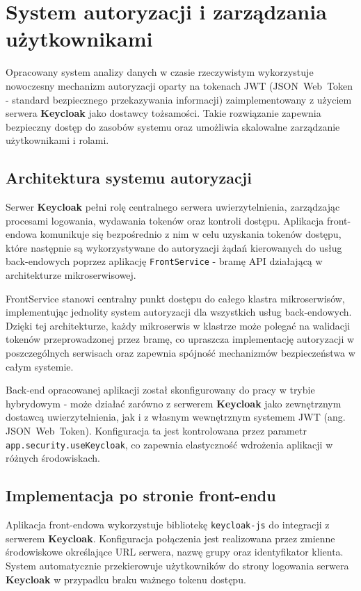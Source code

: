 \section{System autoryzacji i zarządzania użytkownikami}
\label{chap:autoryzacja}

Opracowany system analizy danych w czasie rzeczywistym wykorzystuje nowoczesny mechanizm autoryzacji oparty na tokenach \mbox{JWT} (\mbox{JSON Web Token} - standard bezpiecznego przekazywania informacji) zaimplementowany z użyciem serwera \textbf{Keycloak} jako dostawcy tożsamości. Takie rozwiązanie zapewnia bezpieczny dostęp do zasobów systemu oraz umożliwia skalowalne zarządzanie użytkownikami i rolami.

\subsection{Architektura systemu autoryzacji}

Serwer \textbf{Keycloak} pełni rolę centralnego serwera uwierzytelnienia, zarządzając procesami logowania, wydawania tokenów oraz kontroli dostępu. Aplikacja front-endowa komunikuje się bezpośrednio z nim w celu uzyskania tokenów dostępu, które następnie są wykorzystywane do autoryzacji żądań kierowanych do usług back-endowych poprzez aplikację \texttt{FrontService} - bramę API działającą w architekturze mikroserwisowej.

FrontService stanowi centralny punkt dostępu do całego klastra mikroserwisów, implementując jednolity system autoryzacji dla wszystkich usług back-endowych. Dzięki tej architekturze, każdy mikroserwis w klastrze może polegać na walidacji tokenów przeprowadzonej przez bramę, co upraszcza implementację autoryzacji w poszczególnych serwisach oraz zapewnia spójność mechanizmów bezpieczeństwa w całym systemie.

Back-end opracowanej aplikacji został skonfigurowany do pracy w trybie hybrydowym - może działać zarówno z serwerem \textbf{Keycloak} jako zewnętrznym dostawcą uwierzytelnienia, jak i z własnym wewnętrznym systemem \mbox{JWT} (ang. \mbox{JSON Web Token}). Konfiguracja ta jest kontrolowana przez parametr \texttt{app.security.useKeycloak}, co zapewnia elastyczność wdrożenia aplikacji w różnych środowiskach.

\subsection{Implementacja po stronie front-endu}

Aplikacja front-endowa wykorzystuje bibliotekę \texttt{keycloak-js} do integracji z serwerem \textbf{Keycloak}. Konfiguracja połączenia jest realizowana przez zmienne środowiskowe określające URL serwera, nazwę grupy oraz identyfikator klienta. System automatycznie przekierowuje użytkowników do strony logowania serwera \textbf{Keycloak} w przypadku braku ważnego tokenu dostępu.

